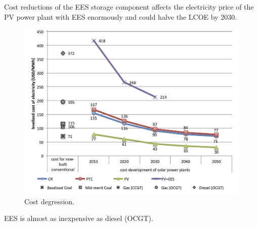 
Cost reductions of the EES storage component affects the electricity price of the PV power plant with EES enormously and could halve the LCOE by 2030.

\begin{figure}[htbp]  
\centering
\includegraphics[width=1\linewidth]{FIG/Costdegrad}
\caption{Cost degression.}\label{Costdegrad}
\end{figure}

EES is almost as inexpensive as diesel (OCGT).